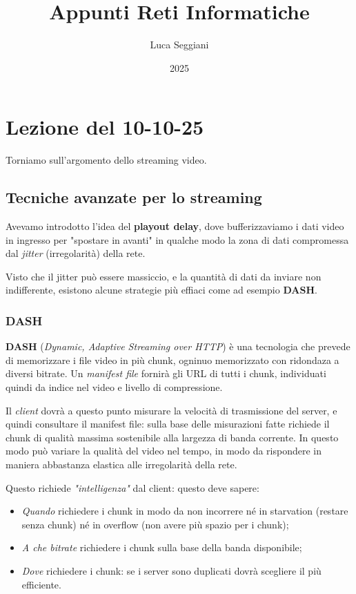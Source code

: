 \documentclass[a4paper,11pt]{article}
\title{Appunti Reti Informatiche}
\author{Luca Seggiani}
\date{2025}
\begin{document}
\section{Lezione del 10-10-25}

\thispagestyle{empty}
\pagestyle{fancy}

Torniamo sull'argomento dello streaming video.

\subsection{Tecniche avanzate per lo streaming}
Avevamo introdotto l'idea del \textbf{playout delay}, dove bufferizzaviamo i dati video in ingresso per "spostare in avanti" in qualche modo la zona di dati compromessa dal \textit{jitter} (irregolarità) della rete.

Visto che il jitter può essere massiccio, e la quantità di dati da inviare non indifferente, esistono alcune strategie più effiaci come ad esempio \textbf{DASH}.

\subsubsection{DASH}
\textbf{DASH} (\textit{Dynamic, Adaptive Streaming over HTTP}) è una tecnologia che prevede di memorizzare i file video in più chunk, ogninuo memorizzato con ridondaza a diversi bitrate. Un \textit{manifest file} fornirà gli URL di tutti i chunk, individuati quindi da indice nel video e livello di compressione.

Il \textit{client} dovrà a questo punto misurare la velocità di trasmissione del server, e quindi consultare il manifest file: sulla base delle misurazioni fatte richiede il chunk di qualità massima sostenibile alla largezza di banda corrente. In questo modo può variare la qualità del video nel tempo, in modo da rispondere in maniera abbastanza elastica alle irregolarità della rete.

Questo richiede \textit{"intelligenza"} dal client: questo deve sapere:
\begin{itemize}
	\item \textit{Quando} richiedere i chunk in modo da non incorrere né in starvation (restare senza chunk) né in overflow (non avere più spazio per i chunk);
	\item \textit{A che bitrate} richiedere i chunk sulla base della banda disponibile;
	\item \textit{Dove} richiedere i chunk: se i server sono duplicati dovrà scegliere il più efficiente.
\end{itemize}
\end{document}
